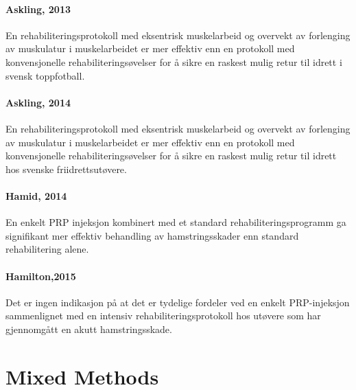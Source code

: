 \documentclass[
]{book}
\begin{document}
\hypertarget{askling-2013-askling2013-1}{%
\subsubsection{\texorpdfstring{Askling, 2013 \citep{askling2013}}{Askling, 2013 {[}@askling2013{]}}}\label{askling-2013-askling2013-1}}

En rehabiliteringsprotokoll med eksentrisk muskelarbeid og overvekt av forlenging av muskulatur i muskelarbeidet er mer effektiv enn en protokoll med konvensjonelle rehabiliteringsøvelser for å sikre en raskest mulig retur til idrett i svensk toppfotball.

\hypertarget{askling-2014-askling2014-1}{%
\subsubsection{\texorpdfstring{Askling, 2014 \citep{askling2014}}{Askling, 2014 {[}@askling2014{]}}}\label{askling-2014-askling2014-1}}

En rehabiliteringsprotokoll med eksentrisk muskelarbeid og overvekt av forlenging av muskulatur i muskelarbeidet er mer effektiv enn en protokoll med konvensjonelle rehabiliteringsøvelser for å sikre en raskest mulig retur til idrett hos svenske friidrettsutøvere.

\hypertarget{hamid-2014-ahamid2014-1}{%
\subsubsection{\texorpdfstring{Hamid, 2014 \citep{ahamid2014}}{Hamid, 2014 {[}@ahamid2014{]}}}\label{hamid-2014-ahamid2014-1}}

En enkelt PRP injeksjon kombinert med et standard rehabiliteringsprogramm ga signifikant mer effektiv behandling av hamstringsskader enn standard rehabilitering alene.

\hypertarget{hamilton2015-hamilton2015-1}{%
\subsubsection{\texorpdfstring{Hamilton,2015 \citep{hamilton2015}}{Hamilton,2015 {[}@hamilton2015{]}}}\label{hamilton2015-hamilton2015-1}}

Det er ingen indikasjon på at det er tydelige fordeler ved en enkelt PRP-injeksjon sammenlignet med en intensiv rehabiliteringsprotokoll hos utøvere som har gjennomgått en akutt hamstringsskade.

\hypertarget{mixed-methods}{%
\chapter{Mixed Methods}\label{mixed-methods}}
\end{document}
